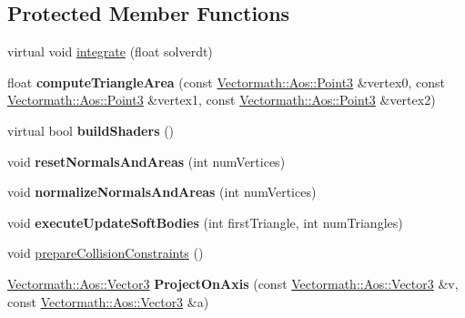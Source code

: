 \subsection*{Protected Member Functions}
\begin{DoxyCompactItemize}
\item 
virtual void \hyperlink{classbt_d_x11_soft_body_solver_a3daaaf85934fabb4c38ae0d32ec77678}{integrate} (float solverdt)
\item 
\hypertarget{classbt_d_x11_soft_body_solver_ab9ced309389f25315b8e8a4a7bca2d32}{float {\bfseries compute\+Triangle\+Area} (const \hyperlink{class_vectormath_1_1_aos_1_1_point3}{Vectormath\+::\+Aos\+::\+Point3} \&vertex0, const \hyperlink{class_vectormath_1_1_aos_1_1_point3}{Vectormath\+::\+Aos\+::\+Point3} \&vertex1, const \hyperlink{class_vectormath_1_1_aos_1_1_point3}{Vectormath\+::\+Aos\+::\+Point3} \&vertex2)}\label{classbt_d_x11_soft_body_solver_ab9ced309389f25315b8e8a4a7bca2d32}

\item 
\hypertarget{classbt_d_x11_soft_body_solver_a6882e59c906688e8dd7c5e8577ae06e3}{virtual bool {\bfseries build\+Shaders} ()}\label{classbt_d_x11_soft_body_solver_a6882e59c906688e8dd7c5e8577ae06e3}

\item 
\hypertarget{classbt_d_x11_soft_body_solver_a58570c531d86cef2819fce83e58b143b}{void {\bfseries reset\+Normals\+And\+Areas} (int num\+Vertices)}\label{classbt_d_x11_soft_body_solver_a58570c531d86cef2819fce83e58b143b}

\item 
\hypertarget{classbt_d_x11_soft_body_solver_a53a44cfa955c8732830fb7f6ea883374}{void {\bfseries normalize\+Normals\+And\+Areas} (int num\+Vertices)}\label{classbt_d_x11_soft_body_solver_a53a44cfa955c8732830fb7f6ea883374}

\item 
\hypertarget{classbt_d_x11_soft_body_solver_a1fb539e6d26045cd5d3aa74db49f072c}{void {\bfseries execute\+Update\+Soft\+Bodies} (int first\+Triangle, int num\+Triangles)}\label{classbt_d_x11_soft_body_solver_a1fb539e6d26045cd5d3aa74db49f072c}

\item 
void \hyperlink{classbt_d_x11_soft_body_solver_a887cc48c63b010cd511e11ce11ea6acd}{prepare\+Collision\+Constraints} ()
\item 
\hypertarget{classbt_d_x11_soft_body_solver_a5f9cf994e2905b2ca50c0f1da8f7bf2e}{\hyperlink{class_vectormath_1_1_aos_1_1_vector3}{Vectormath\+::\+Aos\+::\+Vector3} {\bfseries Project\+On\+Axis} (const \hyperlink{class_vectormath_1_1_aos_1_1_vector3}{Vectormath\+::\+Aos\+::\+Vector3} \&v, const \hyperlink{class_vectormath_1_1_aos_1_1_vector3}{Vectormath\+::\+Aos\+::\+Vector3} \&a)}\label{classbt_d_x11_soft_body_solver_a5f9cf994e2905b2ca50c0f1da8f7bf2e}


\end{DoxyCompactItemize}
